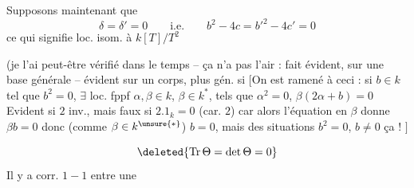 Supposons maintenant que
\[
\delta=\delta'=0\qquad \text{i.e.}\qquad b^2-4c=b'^2-4c'=0
\]
 ce qui signifie   loc. isom. à $k[T]/T^2$


(je l'ai peut-être vérifié dans le temps -- ça n'a pas l'air  : fait évident, sur une base générale -- évident sur un corps, plus gén. si $\bigl[$On est ramené à ceci : si $b\in k$ tel que $b^2=0$, $\exists$ loc. fppf $\alpha,\beta\in k$, $\beta\in k^*$, tels que $\alpha^2=0$, $\beta(2\alpha+b)=0$ Evident si $2$ inv., mais faux si $2.1_k=0$ (car. $2$) car  alors l'équation en $\beta$ donne $\beta b=0$ donc (comme $\beta\in k^{\unsure{*}}$) $b=0$, mais des situations $b^2=0$, $b\ne0$ ça  ! $\bigr]$

      
\[
\deleted{\operatorname{Tr}\Theta=\det\Theta=0}
\]
 Il y a corr. $1-1$ entre une
